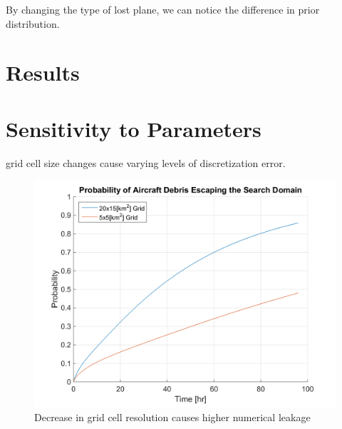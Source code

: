 \documentclass[12pt, letterpaper]{article}  %
\theoremstyle{definition}
\theoremstyle{remark}
\theoremstyle{plain}
\begin{document}
By changing the type of lost plane, we can notice the difference in prior distribution.



\section{Results}\label{sec:results}










\section{Sensitivity to Parameters}\label{sec:sensitive}


grid cell size changes cause varying levels of discretization error.

\begin{center}
	\begin{figure}[H]
		\centering
		\includegraphics[width=0.8\linewidth]{simulation/NoSearchEscapeExplain}
		\caption{Decrease in grid cell resolution causes higher numerical leakage}
		\label{fig:NoSearchEscapeExplain}
	\end{figure}
\end{center}
\end{document}
